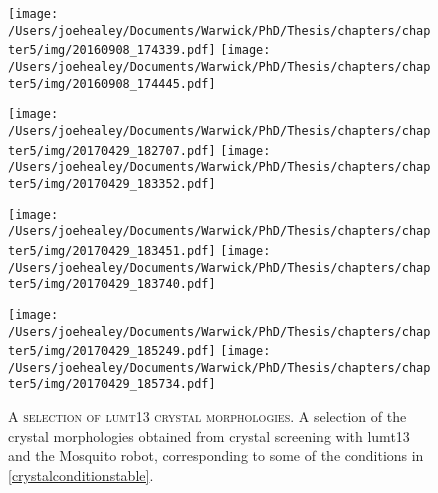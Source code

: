 \begin{figure}[p]
	\centering                                   %
	\texttt{[image: /Users/joehealey/Documents/Warwick/PhD/Thesis/chapters/chapter5/img/20160908\_174339.pdf]}
	\texttt{[image: /Users/joehealey/Documents/Warwick/PhD/Thesis/chapters/chapter5/img/20160908\_174445.pdf]}
	
	\texttt{[image: /Users/joehealey/Documents/Warwick/PhD/Thesis/chapters/chapter5/img/20170429\_182707.pdf]}
	\texttt{[image: /Users/joehealey/Documents/Warwick/PhD/Thesis/chapters/chapter5/img/20170429\_183352.pdf]}
	
	\texttt{[image: /Users/joehealey/Documents/Warwick/PhD/Thesis/chapters/chapter5/img/20170429\_183451.pdf]}
	\texttt{[image: /Users/joehealey/Documents/Warwick/PhD/Thesis/chapters/chapter5/img/20170429\_183740.pdf]}
	
	\texttt{[image: /Users/joehealey/Documents/Warwick/PhD/Thesis/chapters/chapter5/img/20170429\_185249.pdf]}
	\texttt{[image: /Users/joehealey/Documents/Warwick/PhD/Thesis/chapters/chapter5/img/20170429\_185734.pdf]}

	\captionsetup{singlelinecheck=off, justification=justified, font=footnotesize, aboveskip=10pt}
	\caption[Crystal images]{\textsc{\normalsize A selection of lumt13 crystal morphologies.}\vspace{0.1cm} \newline A selection of the crystal morphologies obtained from crystal screening with lumt13 and the Mosquito robot, corresponding to some of the conditions in \vref{crystalconditionstable}.}
	\label{crystals}
\end{figure}

\clearpage

